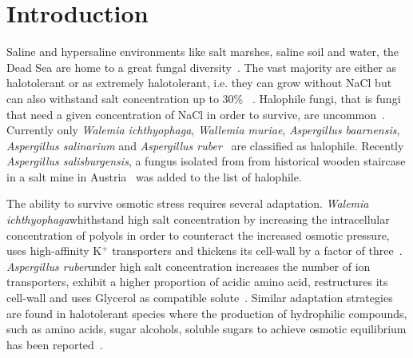 \documentclass[jof,article,submit,moreauthors,pdftex,10pt,a4paper]{Definitions/mdpi}
\newcommand{\aspRub}{\textit{Aspergillus ruber}}
\newcommand{\walIch}{\textit{Walemia ichthyophaga}}
\newcommand{\phiSp}{\textit{Aspergillus salisburgensis}}
\begin{document}



\section{Introduction}
Saline and hypersaline environments like salt marshes, saline soil and water, the Dead Sea are home to a great fungal diversity~\cite{Gunde-Cimerman2014}. The vast majority are either as halotolerant or as extremely halotolerant, i.e. they can grow without NaCl but can also withstand salt concentration up to 30$\%$ ~\cite{Gunde-Cimerman2000}. Halophile fungi, that is fungi that need a given concentration of NaCl in order to survive, are uncommon~\cite{Gunde-Cimerman2000}. Currently only \walIch{}, \textit{Wallemia muriae}, \textit{Aspergillus baarnensis}, \textit{Aspergillus salinarium} and \aspRub{}~\cite{Kis-Papo2014-dn} are classified as halophile. Recently \phiSp{}, a fungus isolated from from historical wooden staircase in a salt mine in Austria~\cite{Martinelli2017AspergillusMorphology} was added to the list of halophile.

The ability to survive osmotic stress requires several adaptation. \walIch whithstand high salt concentration by increasing the intracellular concentration of polyols in order to counteract the increased osmotic pressure, uses high-affinity K$^+$ transporters and thickens its cell-wall by a factor of three~\cite{Zajc2013}. \aspRub under high salt concentration increases the number of ion transporters, exhibit a higher proportion of acidic amino acid, restructures its cell-wall and uses Glycerol as compatible solute~\cite{Kis-Papo2014-dn}.
Similar adaptation strategies are found in halotolerant species where the production of hydrophilic compounds, such as amino acids, sugar alcohols, soluble sugars to achieve osmotic equilibrium has been reported~\cite{Attaby2001,Plemenitas2014-et,Krauke2010-ed,Michan2013,Salmeron2011}.
\end{document}
